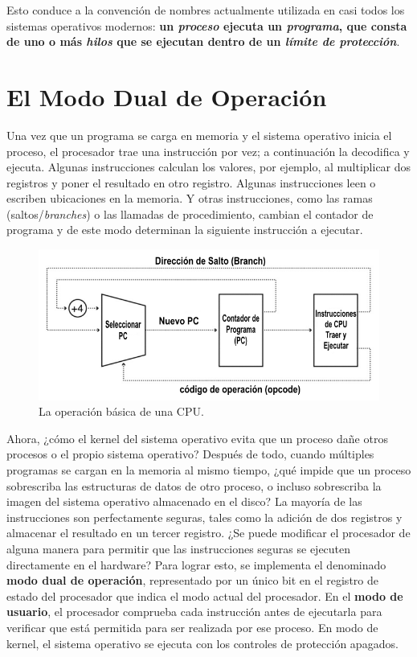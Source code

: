 \documentclass[10pt]{book}
\begin{document}
Esto conduce a la convención de nombres actualmente utilizada en casi todos los sistemas operativos modernos: \textbf{un \textit{proceso} ejecuta un \textit{programa}, que consta de uno o más \textit{hilos} que se ejecutan dentro de un \textit{límite de protección}}.


\section{El Modo Dual de Operación}
Una vez que un programa se carga en memoria y el sistema operativo inicia el proceso, el procesador trae una instrucción por vez; a continuación la decodifica y ejecuta. Algunas instrucciones calculan los valores, por ejemplo, al multiplicar dos registros y poner el resultado en otro registro. Algunas instrucciones leen o escriben ubicaciones en la memoria. Y otras instrucciones, como las ramas (saltos/\textit{branches}) o las llamadas de procedimiento, cambian el contador de programa y de este modo determinan la siguiente instrucción a ejecutar.

\begin{figure}[tbhp]
\centerline{\includegraphics[scale=0.70]{img/fig0201}}
\caption{La operación básica de una CPU.}
\label{fig0201}
\end{figure}

Ahora, ¿cómo el kernel del sistema operativo evita que un proceso dañe otros procesos o el propio sistema operativo? Después de todo, cuando múltiples programas se cargan en la memoria al mismo tiempo, ¿qué impide que un proceso sobrescriba las estructuras de datos de otro proceso, o incluso sobrescriba la imagen del sistema operativo almacenado en el disco? La mayoría de las instrucciones son perfectamente seguras, tales como la adición de dos registros y almacenar el resultado en un tercer registro. ¿Se puede modificar el procesador de alguna manera para permitir que las instrucciones seguras se ejecuten directamente en el hardware? Para lograr esto, se implementa el denominado \textbf{modo dual de operación}, representado por un único bit en el registro de estado del procesador que indica el modo actual del procesador. En el \textbf{modo de usuario}, el procesador comprueba cada instrucción antes de ejecutarla para verificar que está permitida para ser realizada por ese proceso. En modo de kernel, el sistema operativo se ejecuta con los controles de protección apagados.
\end{document}

